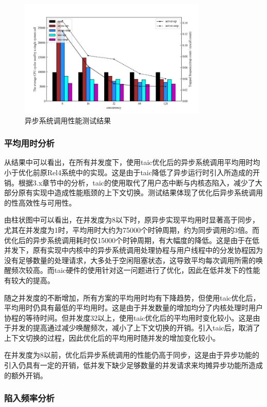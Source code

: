 \begin{figure}[htbp]
  \centering
  \includegraphics[width=0.8\textwidth]{images/async_syscall.jpg}
  \caption{异步系统调用性能测试结果}\label{asyncSyscall}
\end{figure}

\subsubsection{平均用时分析}

从结果中可以看出，在所有并发度下，使用taic优化后的异步系统调用平均用时均小于优化前原Rel4系统中的实现。这是由于taic降低了异步运行时引入所造成的开销。根据3.x章节中的分析，taic的使用取代了用户态中断与内核态陷入，减少了大部分原有实现中造成性能瓶颈的上下文切换。测试结果体现了优化后异步系统调用的性高效性与可用性。

由柱状图中可以看出，在并发度为8以下时，原异步实现平均用时显著高于同步，尤其在并发度为1时，平均用时大约为75000个时钟周期，约为同步调用的3倍。而优化后的异步系统调用耗时仅15000个时钟周期，有大幅度的降低。这是由于在低并发下，原有实现中内核中的异步系统调用处理协程与用户线程中的分发协程因为没有足够数量的处理请求，大多处于空闲阻塞状态，这导致平均每次调用所需的唤醒频次较高。而taic硬件的使用针对这一问题进行了优化，因此在低并发下的性能有较大的提高。

随之并发度的不断增加，所有方案的平均用时均有下降趋势，但使用taic优化后，平均用时仍具有最低的平均用时。这是由于并发数量的增加均分了内核处理时用户协程的等待时间。但并发度32以上，使用taic优化后的平均用时变化较小。这是由于并发的提高通过减少唤醒频次，减小了上下文切换的开销。引入taic后，取消了上下文切换的过程，因此优化后的平均用时随并发的增加变化较小。

在并发度为8以前，优化后异步系统调用的性能仍高于同步，这是由于异步功能的引入仍具有一定的开销，低并发下缺少足够数量的并发请求来均摊异步功能所造成的额外开销。

\subsubsection{陷入频率分析}

